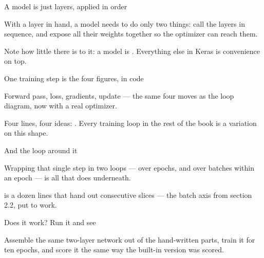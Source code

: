 \documentclass[aspectratio=169,11pt,t]{beamer}
\begin{document}
\begin{frame}[shrink=25]{A model is just layers, applied in order}
{\fontsize{9.4}{12.6}\selectfont\color{fg2}With a layer in hand, a model needs to do only two things: call the layers in sequence, and expose all their weights together so the optimizer can reach them.\par}\vskip 4pt
\begin{iband}[signal]
Note how little there is to it: a model is . Everything else in Keras is convenience on top.
\end{iband}
\end{frame}

\begin{frame}[shrink=25]{One training step is the four figures, in code}
{\fontsize{9.4}{12.6}\selectfont\color{fg2}Forward pass, loss, gradients, update --- the same four moves as the loop diagram, now with a real optimizer.\par}\vskip 4pt
\begin{iband}[signal]
Four lines, four ideas: . Every training loop in the rest of the book is a variation on this shape.
\end{iband}
\end{frame}

\begin{frame}[shrink=25]{And the loop around it}
{\fontsize{9.4}{12.6}\selectfont\color{fg2}Wrapping that single step in two loops --- over epochs, and over batches within an epoch --- is all that  does underneath.\par}\vskip 4pt
{\fontsize{9.4}{12.6}\selectfont\color{fg2} is a dozen lines that hand out consecutive slices --- the batch axis from section 2.2, put to work.\par}\vskip 4pt
\end{frame}

\begin{frame}[shrink=25]{Does it work? Run it and see}
{\fontsize{9.4}{12.6}\selectfont\color{fg2}Assemble the same two-layer network out of the hand-written parts, train it for ten epochs, and score it the same way the built-in version was scored.\par}\vskip 4pt
\end{frame}
\end{document}
